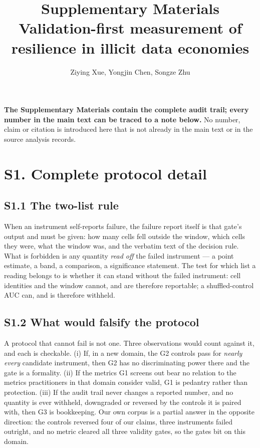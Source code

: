 \documentclass[11pt,a4paper]{article}
\title{\bfseries Supplementary Materials\\
\large Validation-first measurement of resilience in illicit data economies}
\author{Ziying Xue, Yongjin Chen, Songze Zhu}
\date{}
\begin{document}
\maketitle

\noindent\textbf{The Supplementary Materials contain the complete audit trail;
every number in the main text can be traced to a note below.} No number, claim
or citation is introduced here that is not already in the main text or in the
source analysis records.

\section*{S1. Complete protocol detail}

\subsection*{S1.1 The two-list rule}

When an instrument self-reports failure, the failure report itself is that
gate's output and must be given: how many cells fell outside the window, which
cells they were, what the window was, and the verbatim text of the decision
rule. What is forbidden is any quantity \emph{read off} the failed instrument ---
a point estimate, a band, a comparison, a significance statement. The test for
which list a reading belongs to is whether it can stand without the failed
instrument: cell identities and the window cannot, and are therefore reportable;
a shuffled-control AUC can, and is therefore withheld.

\subsection*{S1.2 What would falsify the protocol}

A protocol that cannot fail is not one. Three observations would count against
it, and each is checkable. (i) If, in a new domain, the G2 controls pass for
\emph{nearly every} candidate instrument, then G2 has no discriminating power
there and the gate is a formality. (ii) If the metrics G1 screens out bear no
relation to the metrics practitioners in that domain consider valid, G1 is
pedantry rather than protection. (iii) If the audit trail never changes a
reported number, and no quantity is ever withheld, downgraded or reversed by the
controls it is paired with, then G3 is bookkeeping. Our own corpus is a partial
answer in the opposite direction: the controls reversed four of our claims,
three instruments failed outright, and no metric cleared all three validity
gates, so the gates bit on this domain.
\end{document}
